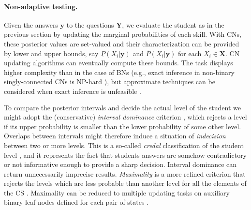 \documentclass[runningheads]{llncs}
\begin{document}
	\paragraph{Non-adaptive testing.} Given the answers $\bm{y}$ to the questions 
	$\bm{Y}$, we evaluate the student as in the previous section by updating the marginal 
	probabilities of each skill. With CNs, these posterior values are set-valued and their 
	characterization can be provided by lower and upper bounds, say 
	$\underline{P}(X_i|\bm{y})$ and $\overline{P}(X_i|\bm{y})$ for each $X_i\in\bm{X}$. CN 
	updating algorithms can eventually compute these bounds. The task displays higher 
	complexity than in the case of BNs (e.g., exact inference in non-binary 
	singly-connected CNs is NP-hard \cite{maua14jair}), but approximate techniques can be 
	considered when exact inference is unfeasible \cite{antonucci2014e}. 
	
	To compare the posterior intervals and decide the actual level of the student we might 
	adopt the (conservative) \emph{interval dominance} criterion \cite{troffaes}, which 
	rejects a level if its upper probability is smaller than the lower probability of some other 
	level. Overlaps between intervals might therefore induce a situation of 
	\emph{indecision} between two or more levels. This is a so-called \emph{credal} 
	classification of the student level \cite{zaffalon2012evaluating}, and it represents the 
	fact that students answers are somehow contradictory or not informative enough to 
	provide a sharp decision. Interval dominance can return unnecessarily imprecise results. 
	\emph{Maximality} is a more refined criterion that rejects the levels which are less 
	probable than another level for all the elements of the CS \cite{walley1991statistical}. 
	Maximality  can be reduced to multiple updating tasks on auxiliary binary leaf nodes 
	defined for each pair of states \cite{antonucci2014e}.
	
\end{document}
